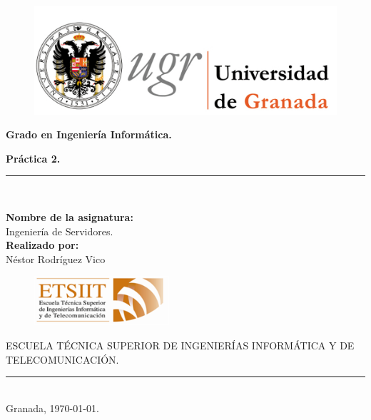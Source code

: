 \documentclass[a4paper,titlepage,12pt]{scrartcl}	%
\numberwithin{figure}{section} %
\numberwithin{table}{section} %
\begin{document}
	\begin{titlepage}
		\begin{center}
			\begin{figure}[htb]
				\begin{center}
					\includegraphics[width=12cm]{./Portada/ugr.png}
				\end{center}
			\end{figure}

			\vspace*{0.8cm}
			\begin{Large}
				\textbf{Grado en Ingeniería Informática.}\\
			\end{Large}
			\begin{Huge}
				\vspace{1.5cm}
				\textbf{Práctica 2.} \\
			\end{Huge}
			\vspace*{0.76cm}
			\rule{100mm}{0.1mm}\\
			\vspace*{0.5cm}
			\begin{large}
				\textbf{Nombre de la asignatura:}\\
				Ingeniería de Servidores.\\
				\vspace*{0.5cm}
				\textbf{Realizado por:}\\
				Néstor Rodríguez Vico \\

				\vspace*{2cm}
				\begin{figure}[htb]
					\begin{center}
						\includegraphics[width=5cm]{./Portada/etsiit.png}
					\end{center}
				\end{figure}
				\vspace*{-0.6cm}
				ESCUELA TÉCNICA SUPERIOR DE INGENIERÍAS INFORMÁTICA Y DE TELECOMUNICACIÓN.\\
				\rule{20mm}{0.1mm}\\
				\vspace*{0.6cm}
				Granada, \today.
			\end{large}
		\end{center}
	\end{titlepage}
	
\end{document}
